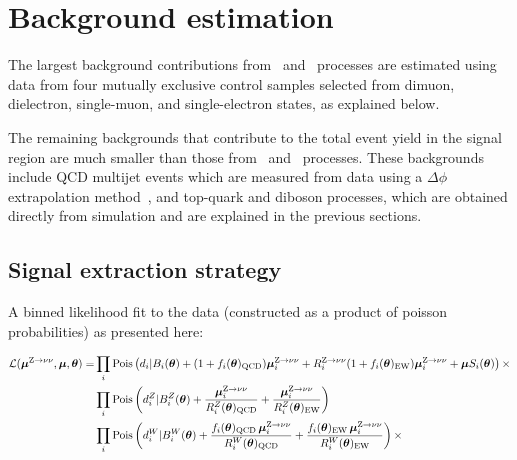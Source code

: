 \section{Background estimation} \label{sec:bkg}

The largest background contributions from \Zvvjets~and \Wlvjets~processes
are estimated using data from four mutually exclusive control samples selected
from dimuon, dielectron, single-muon, and single-electron states,
as explained below.

The remaining backgrounds that contribute to the total event yield in the signal region
are much smaller than those from \Zvvjets~and \Wlvjets~processes. These backgrounds
include QCD multijet events which are measured from data using a $\Delta\phi$ extrapolation
method~\cite{Collaboration:2011ida,paper-exo-037}, and top-quark and diboson processes, which are
obtained directly from simulation and are explained in the previous sections.

\subsection{Signal extraction strategy}

A binned likelihood fit to the data (constructed as a product of poisson probabilities) as presented here:

\begingroup
\small
\begin{align}
\mathcal{L}(\boldsymbol{\mu}^{\mathrm{Z}\to\nu\nu}, \boldsymbol{\mu}, \boldsymbol{\theta}) = &
\prod_{i} \mathrm{Pois}\left(d_{i} | B_{i}(\boldsymbol{\theta}) + (1+f_{i}(\boldsymbol{\theta})_{\mathrm{QCD}}) \boldsymbol{\mu}^{\mathrm{Z}\to\nu\nu}_{i} + R^{\mathrm{\mathrm{Z}\to\nu\nu}}_{i} (1+f_{i}(\boldsymbol{\theta})_{\mathrm{EW}}) \boldsymbol{\mu}^{\mathrm{Z}\to\nu\nu}_{i}+ \boldsymbol{\mu} S_{i}(\boldsymbol{\theta})\right ) \times \nonumber\\
&\prod_{i} \mathrm{Pois} \left(d^{Z}_{i}|B^{Z}_{i}(\boldsymbol{\theta}) +\frac{\boldsymbol{\mu}^{\mathrm{Z}\to\nu\nu}_{i} }{R^{Z}_{i} (\boldsymbol{\theta})_{\mathrm{QCD}}} + \frac{\boldsymbol{\mu}^{\mathrm{Z}\to\nu\nu}_{i} }{R^{Z}_{i} (\boldsymbol{\theta})_{\mathrm{EW}}} \right) \nonumber\\
& \prod_{i} \mathrm{Pois}\left(d^{W}_{i}|B^{W}_{i}(\boldsymbol{\theta}) +\frac{f_{i}(\boldsymbol{\theta})_{\mathrm{QCD}}\,\boldsymbol{\mu}^{\mathrm{Z}\to\nu\nu}_{i}}{R^{W}_{i}(\boldsymbol{\theta})_{\mathrm{QCD}}}+\frac{f_{i}(\boldsymbol{\theta})_{\mathrm{EW}}\,\boldsymbol{\mu}^{\mathrm{Z}\to\nu\nu}_{i} }{R^{W}_{i} (\boldsymbol{\theta})_{\mathrm{EW}}} \right) \times \nonumber\\
\end{align}
\endgroup

